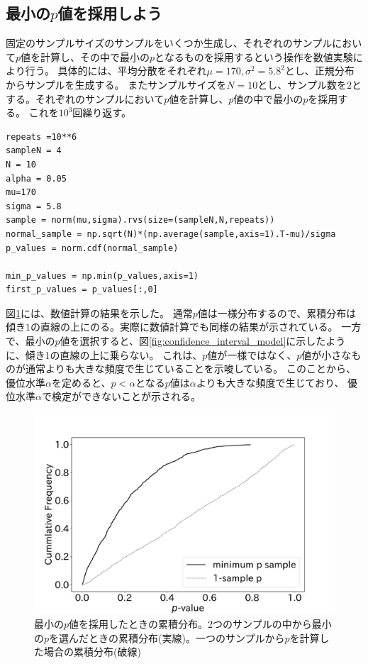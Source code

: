 \subsection{最小の$p$値を採用しよう}
固定のサンプルサイズのサンプルをいくつか生成し、それぞれのサンプルにおいて$p$値を計算し、その中で最小の$p$となるものを採用するという操作を数値実験により行う。
具体的には、平均分散をそれぞれ$\mu=170,\sigma^2=5.8^2$とし、正規分布からサンプルを生成する。
またサンプルサイズを$N=10$とし、サンプル数を$2$とする。それぞれのサンプルにおいて$p$値を計算し、$p$値の中で最小の$p$を採用する。
これを$10^3$回繰り返す。

\begin{lstlisting}
repeats =10**6
sampleN = 4
N = 10
alpha = 0.05
mu=170
sigma = 5.8
sample = norm(mu,sigma).rvs(size=(sampleN,N,repeats)) 
normal_sample = np.sqrt(N)*(np.average(sample,axis=1).T-mu)/sigma
p_values = norm.cdf(normal_sample)

min_p_values = np.min(p_values,axis=1)
first_p_values = p_values[:,0]
\end{lstlisting}

図\ref{fig:minimum_p_value_choice}には、数値計算の結果を示した。
通常$p$値は一様分布するので、累積分布は傾き$1$の直線の上にのる。実際に数値計算でも同様の結果が示されている。
一方で、最小の$p$値を選択すると、図\ref{fig:confidence_interval_model}に示したように、傾き1の直線の上に乗らない。
これは、$p$値が一様ではなく、$p$値が小さなものが通常よりも大きな頻度で生じていることを示唆している。
このことから、優位水準$\alpha$を定めると、$p<\alpha$となる$p$値は$\alpha$よりも大きな頻度で生じており、
優位水準$\alpha$で検定ができないことが示される。

\begin{figure}
  \begin{center}
    \includegraphics[width=15cm]{./image/04_/Minimum-p-values-choice-exmepriment.pdf}
    \caption{最小の$p$値を採用したときの累積分布。2つのサンプルの中から最小の$p$を選んだときの累積分布(実線)。一つのサンプルから$p$を計算した場合の累積分布(破線)}
        \label{fig:minimum_p_value_choice}
    \end{center}
\end{figure}

